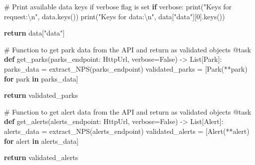 \documentclass[
  letterpaper,
  DIV=11,
  numbers=noendperiod]{scrartcl}
\newenvironment{Shaded}{\begin{snugshade}}{\end{snugshade}}
\newcommand{\AttributeTok}[1]{\textcolor[rgb]{0.40,0.45,0.13}{#1}}
\newcommand{\BuiltInTok}[1]{\textcolor[rgb]{0.00,0.23,0.31}{#1}}
\newcommand{\CharTok}[1]{\textcolor[rgb]{0.13,0.47,0.30}{#1}}
\newcommand{\CommentTok}[1]{\textcolor[rgb]{0.37,0.37,0.37}{#1}}
\newcommand{\ControlFlowTok}[1]{\textcolor[rgb]{0.00,0.23,0.31}{\textbf{#1}}}
\newcommand{\DecValTok}[1]{\textcolor[rgb]{0.68,0.00,0.00}{#1}}
\newcommand{\KeywordTok}[1]{\textcolor[rgb]{0.00,0.23,0.31}{\textbf{#1}}}
\newcommand{\NormalTok}[1]{\textcolor[rgb]{0.00,0.23,0.31}{#1}}
\newcommand{\OperatorTok}[1]{\textcolor[rgb]{0.37,0.37,0.37}{#1}}
\newcommand{\StringTok}[1]{\textcolor[rgb]{0.13,0.47,0.30}{#1}}
\newcommand{\VariableTok}[1]{\textcolor[rgb]{0.07,0.07,0.07}{#1}}
\begin{document}
\begin{Shaded}
\begin{Highlighting}[]
    \CommentTok{\# Print available data keys if verbose flag is set}
    \ControlFlowTok{if}\NormalTok{ verbose:}
        \BuiltInTok{print}\NormalTok{(}\StringTok{"Keys for request:}\CharTok{\textbackslash{}n}\StringTok{"}\NormalTok{, data.keys())}
        \BuiltInTok{print}\NormalTok{(}\StringTok{"Keys for \textquotesingle{}data\textquotesingle{}:}\CharTok{\textbackslash{}n}\StringTok{"}\NormalTok{, data[}\StringTok{"data"}\NormalTok{][}\DecValTok{0}\NormalTok{].keys())}

    \ControlFlowTok{return}\NormalTok{ data[}\StringTok{"data"}\NormalTok{]}

\CommentTok{\# Function to get park data from the API and return as validated objects}
\AttributeTok{@task}
\KeywordTok{def}\NormalTok{ get\_parks(parks\_endpoint: HttpUrl, verbose}\OperatorTok{=}\VariableTok{False}\NormalTok{) }\OperatorTok{{-}\textgreater{}}\NormalTok{ List[Park]:}
\NormalTok{    parks\_data }\OperatorTok{=}\NormalTok{ extract\_NPS(parks\_endpoint)}
\NormalTok{    validated\_parks }\OperatorTok{=}\NormalTok{ [Park(}\OperatorTok{**}\NormalTok{park) }\ControlFlowTok{for}\NormalTok{ park }\KeywordTok{in}\NormalTok{ parks\_data]}

    \ControlFlowTok{return}\NormalTok{ validated\_parks}

\CommentTok{\# Function to get alert data from the API and return as validated objects}
\AttributeTok{@task}
\KeywordTok{def}\NormalTok{ get\_alerts(alerts\_endpoint: HttpUrl, verbose}\OperatorTok{=}\VariableTok{False}\NormalTok{) }\OperatorTok{{-}\textgreater{}}\NormalTok{ List[Alert]:}
\NormalTok{    alerts\_data }\OperatorTok{=}\NormalTok{ extract\_NPS(alerts\_endpoint)}
\NormalTok{    validated\_alerts }\OperatorTok{=}\NormalTok{ [Alert(}\OperatorTok{**}\NormalTok{alert) }\ControlFlowTok{for}\NormalTok{ alert }\KeywordTok{in}\NormalTok{ alerts\_data]}

    \ControlFlowTok{return}\NormalTok{ validated\_alerts}


\end{Highlighting}
\end{Shaded}
\end{document}

